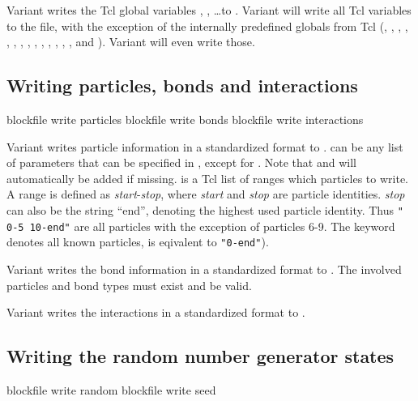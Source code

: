 Variant  writes the Tcl global variables ,
, \dots to . Variant  will write
all Tcl variables to the file, with the exception of the internally
predefined globals from Tcl (, ,
, , , ,
, , , ,
, , , ,
 and ). Variant  will
even write those.

\subsection{Writing particles, bonds and interactions}
\begin{essyntax}
   blockfile  write particles 
   
   blockfile  write bonds 
   blockfile  write interactions
\end{essyntax}

Variant  writes
particle information in a standardized format to .
 can be any list of parameters that can be specified in
, except for .  Note that
 and  will automatically be added if missing.
 is a Tcl list of ranges which particles to write. A range
is defined as \textit{start}-\textit{stop}, where \textit{start} and
\textit{stop} are particle identities. \textit{stop} can also be the
string ``end'', denoting the highest used particle identity. Thus
\texttt{"{} 0-5 10-end"{}} are all particles with the exception of
particles 6-9.  The keyword  denotes all known particles,
\ie{} is eqivalent to \texttt{"0-end"{}}).

Variant  writes the bond information in a standardized
format to . The involved particles and bond types must
exist and be valid.

Variant  writes the interactions in a standardized format
to .

\subsection{Writing the random number generator states}
\begin{essyntax}
   blockfile  write random
   blockfile  write seed
\end{essyntax}

